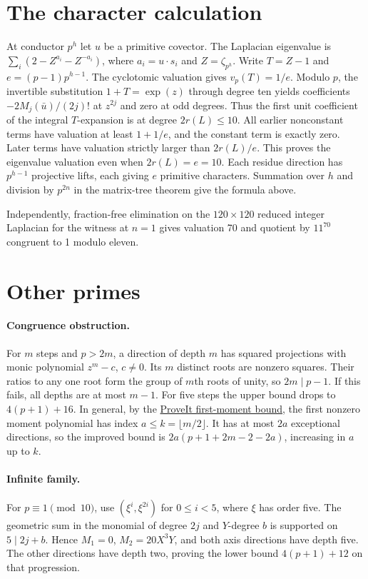 \documentclass[11pt]{article}
\begin{document}
\section{The character calculation}
At conductor $p^h$ let $u$ be a primitive covector. The Laplacian
eigenvalue is $\sum_i(2-Z^{a_i}-Z^{-a_i})$, where $a_i=u\cdot s_i$
and $Z=\zeta_{p^h}$. Write $T=Z-1$ and $e=(p-1)p^{h-1}$. The
cyclotomic valuation gives $v_p(T)=1/e$. Modulo $p$, the invertible
substitution $1+T=\exp(z)$ through degree ten yields coefficients
$-2M_j(\bar u)/(2j)!$ at $z^{2j}$ and zero at odd degrees.
Thus the first unit coefficient of the integral $T$-expansion
is at degree $2r(L)\le10$. All earlier nonconstant terms have
valuation at least $1+1/e$, and the constant term is exactly zero.
Later terms have valuation strictly larger than $2r(L)/e$.
This proves the eigenvalue valuation even when $2r(L)=e=10$.
Each residue direction has $p^{h-1}$ projective lifts, each giving
$e$ primitive characters. Summation over $h$ and division by
$p^{2n}$ in the matrix-tree theorem give the formula above.

Independently, fraction-free elimination on the $120\times120$
reduced integer Laplacian for the witness at $n=1$ gives valuation
70 and quotient by $11^{70}$ congruent to 1 modulo eleven.
\section{Other primes}
\paragraph{Congruence obstruction.}
For $m$ steps and $p>2m$, a direction of depth $m$ has squared
projections with monic polynomial $z^m-c$, $c\ne0$. Its $m$
distinct roots are nonzero squares. Their ratios to any one root
form the group of $m$th roots of unity, so $2m\mid p-1$.
If this fails, all depths are at most $m-1$. For five steps the
upper bound drops to $4(p+1)+16$. In general, by the
\href{https://github.com/VladimirReshetnikov/ProveIt/blob/21c0252ffe8611baa0fbf528fbb003d6c42ca9af/Analysis/GeneralizedRiemannHypothesis/Research/grh_transfer_extensions_2026-11-26/sections/graph_extremum.tex}{ProveIt first-moment bound},
the first nonzero moment polynomial has index $a\le k=\lfloor m/2\rfloor$.
It has at most $2a$ exceptional directions, so the improved bound
is $2a(p+1+2m-2-2a)$, increasing in $a$ up to $k$.

\paragraph{Infinite family.}
For $p\equiv1\pmod{10}$, use $(\xi^i,\xi^{2i})$ for $0\le i<5$,
where $\xi$ has order five. The geometric sum in the monomial
of degree $2j$ and $Y$-degree $b$ is supported on $5\mid 2j+b$.
Hence $M_1=0$, $M_2=20X^3Y$, and both axis directions have
depth five. The other directions have depth two, proving the
lower bound $4(p+1)+12$ on that progression.
\end{document}
